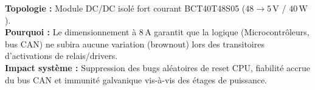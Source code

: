 \begin{decisionbox}
\textbf{Topologie :} Module DC/DC isolé fort courant BCT40T48S05 ($48 \to 5 \, \text{V}$ / $40 \, \text{W}$). \\
\textbf{Pourquoi :} Le dimensionnement à $8 \, \text{A}$ garantit que la logique (Microcontrôleurs, bus CAN) ne subira aucune variation (brownout) lors des transitoires d'activations de relais/drivers. \\
\textbf{Impact système :} Suppression des bugs aléatoires de reset CPU, fiabilité accrue du bus CAN et immunité galvanique vis-à-vis des étages de puissance.
\end{decisionbox}


